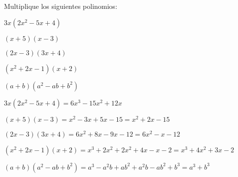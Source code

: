 \begin{exercise}
\problem Multiplique los siguientes polinomios:

\begin{exerciselist}
    \item $3x(2x^2 - 5x + 4)$
    \item $(x + 5)(x - 3)$
    \item $(2x - 3)(3x + 4)$
    \item $(x^2 + 2x - 1)(x + 2)$
    \item $(a + b)(a^2 - ab + b^2)$
\end{exerciselist}

\begin{solucion}
\begin{exerciselist}
    \item $3x(2x^2 - 5x + 4) = 6x^3 - 15x^2 + 12x$
    
    \item $(x + 5)(x - 3) = x^2 - 3x + 5x - 15 = x^2 + 2x - 15$
    
    \item $(2x - 3)(3x + 4) = 6x^2 + 8x - 9x - 12 = 6x^2 - x - 12$
    
    \item $(x^2 + 2x - 1)(x + 2) = x^3 + 2x^2 + 2x^2 + 4x - x - 2 = x^3 + 4x^2 + 3x - 2$
    
    \item $(a + b)(a^2 - ab + b^2) = a^3 - a^2b + ab^2 + a^2b - ab^2 + b^3 = a^3 + b^3$
\end{exerciselist}
\end{solucion}
\end{exercise}

